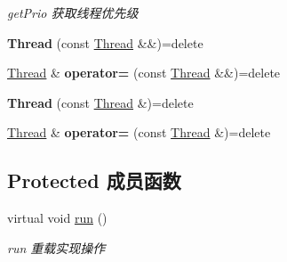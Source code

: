 \begin{DoxyCompactItemize}
\begin{DoxyCompactList}\small\item\em get\+Prio 获取线程优先级 \end{DoxyCompactList}\item 
\mbox{\label{classThread_a9c8be569889e6acc065a9db76f738952}} 
{\bfseries Thread} (const \hyperlink{classThread}{Thread} \&\&)=delete
\item 
\mbox{\label{classThread_ab6968c245fad4970965b3bf9f6027642}} 
\hyperlink{classThread}{Thread} \& {\bfseries operator=} (const \hyperlink{classThread}{Thread} \&\&)=delete
\item 
\mbox{\label{classThread_a71c9b9c8fb2e87eb14279f6233a83143}} 
{\bfseries Thread} (const \hyperlink{classThread}{Thread} \&)=delete
\item 
\mbox{\label{classThread_a832b2ddff787923f27430d95df55c83d}} 
\hyperlink{classThread}{Thread} \& {\bfseries operator=} (const \hyperlink{classThread}{Thread} \&)=delete
\end{DoxyCompactItemize}
\subsection*{Protected 成员函数}
\begin{DoxyCompactItemize}
\item 
\mbox{\label{classThread_a7574ff300357f9d3193db03b83937eac}} 
virtual void \hyperlink{classThread_a7574ff300357f9d3193db03b83937eac}{run} ()
\begin{DoxyCompactList}\small\item\em run 重载实现操作 \end{DoxyCompactList}\end{DoxyCompactItemize}
